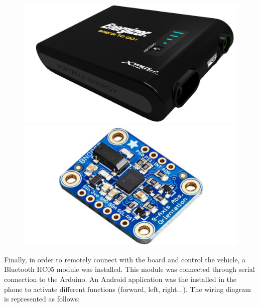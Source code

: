 \begin{itemize}
\begin{itemize}
	\begin{figure}[!h]
			\includegraphics[width=1.0\linewidth]{figs/04/battery}
		\endminipage\hfill
			\includegraphics[width=1.0\linewidth]{figs/04/bno055}
		\endminipage\hfill
	\end{figure}

	\newpage
	Finally, in order to remotely connect with the board and control the vehicle, a Bluetooth HC05 module was installed. This module was connected through serial connection to the Arduino. An Android application was the installed in the phone to activate different functions (forward, left, right...). The wiring diagram is represented as follows:
	

\end{itemize}
\end{itemize}
